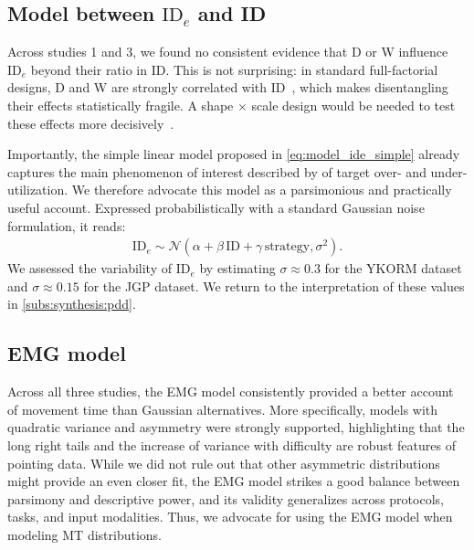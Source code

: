 \documentclass[acmlarge, manuscript,review]{acmart}
\newcommand{\ide}{\ensuremath{{\text{ID}_e}}\xspace}
\begin{document}


\subsection{Model between \ide and ID}
Across studies 1 and 3, we found no consistent evidence that D or W influence \ide beyond their ratio in ID. This is not surprising: in standard full-factorial designs, D and W are strongly correlated with ID~\cite{gori2018chi}, which makes disentangling their effects statistically fragile. A shape $\times$ scale design would be needed to test these effects more decisively~\cite{guiard2009}.


Importantly, the simple linear model proposed in \autoref{eq:model_ide_simple} already captures the main phenomenon of interest described by \citeauthor{zhai2004nominal} of target over- and under-utilization. We therefore advocate this model as a parsimonious and practically useful account. Expressed probabilistically with a standard Gaussian noise formulation, it reads:
\begin{align}
	\ide  \sim \mathcal{N}\left( \alpha + \beta\,\text{ID} + \gamma\,\text{strategy}, \sigma^2 \right).\label{eq:probabilistic_ide}
\end{align}
We assessed the variability of \ide by estimating $\sigma \approx 0.3$ for the YKORM dataset and $\sigma \approx 0.15$ for the JGP dataset. We return to the interpretation of these values in \autoref{subs:synthesis:pdd}.



\subsection{EMG model}
Across all three studies, the EMG model consistently provided a better account of movement time than Gaussian alternatives. More specifically, models with quadratic variance and asymmetry were strongly supported, highlighting that the long right tails and the increase of variance with difficulty are robust features of pointing data. While we did not rule out that other asymmetric distributions might provide an even closer fit, the EMG model strikes a good balance between parsimony and descriptive power, and its validity generalizes across protocols, tasks, and input modalities. Thus, we advocate for using the EMG model when modeling MT distributions. 
\end{document}
